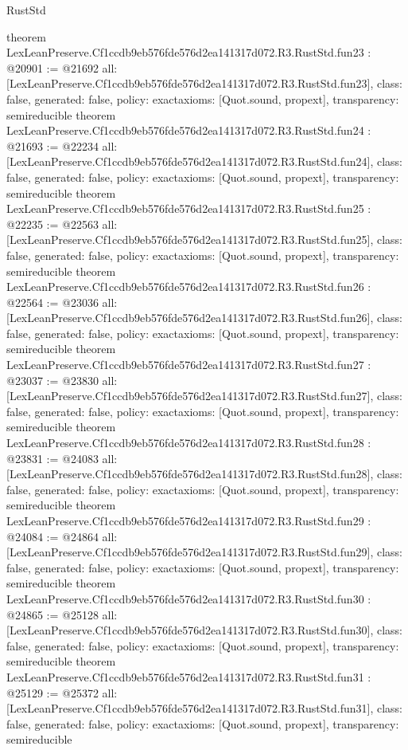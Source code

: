 \begin{lexlean}{RustStd}
\begin{coremodule}
{}
theorem LexLeanPreserve.Cf1ccdb9eb576fde576d2ea141317d072.R3.RustStd.fun23 : @20901 := @21692 {
  all: [LexLeanPreserve.Cf1ccdb9eb576fde576d2ea141317d072.R3.RustStd.fun23],
  class: false,
  generated: false,
  policy: exact{axioms: [Quot.sound, propext]},
  transparency: semireducible
}
theorem LexLeanPreserve.Cf1ccdb9eb576fde576d2ea141317d072.R3.RustStd.fun24 : @21693 := @22234 {
  all: [LexLeanPreserve.Cf1ccdb9eb576fde576d2ea141317d072.R3.RustStd.fun24],
  class: false,
  generated: false,
  policy: exact{axioms: [Quot.sound, propext]},
  transparency: semireducible
}
theorem LexLeanPreserve.Cf1ccdb9eb576fde576d2ea141317d072.R3.RustStd.fun25 : @22235 := @22563 {
  all: [LexLeanPreserve.Cf1ccdb9eb576fde576d2ea141317d072.R3.RustStd.fun25],
  class: false,
  generated: false,
  policy: exact{axioms: [Quot.sound, propext]},
  transparency: semireducible
}
theorem LexLeanPreserve.Cf1ccdb9eb576fde576d2ea141317d072.R3.RustStd.fun26 : @22564 := @23036 {
  all: [LexLeanPreserve.Cf1ccdb9eb576fde576d2ea141317d072.R3.RustStd.fun26],
  class: false,
  generated: false,
  policy: exact{axioms: [Quot.sound, propext]},
  transparency: semireducible
}
theorem LexLeanPreserve.Cf1ccdb9eb576fde576d2ea141317d072.R3.RustStd.fun27 : @23037 := @23830 {
  all: [LexLeanPreserve.Cf1ccdb9eb576fde576d2ea141317d072.R3.RustStd.fun27],
  class: false,
  generated: false,
  policy: exact{axioms: [Quot.sound, propext]},
  transparency: semireducible
}
theorem LexLeanPreserve.Cf1ccdb9eb576fde576d2ea141317d072.R3.RustStd.fun28 : @23831 := @24083 {
  all: [LexLeanPreserve.Cf1ccdb9eb576fde576d2ea141317d072.R3.RustStd.fun28],
  class: false,
  generated: false,
  policy: exact{axioms: [Quot.sound, propext]},
  transparency: semireducible
}
theorem LexLeanPreserve.Cf1ccdb9eb576fde576d2ea141317d072.R3.RustStd.fun29 : @24084 := @24864 {
  all: [LexLeanPreserve.Cf1ccdb9eb576fde576d2ea141317d072.R3.RustStd.fun29],
  class: false,
  generated: false,
  policy: exact{axioms: [Quot.sound, propext]},
  transparency: semireducible
}
theorem LexLeanPreserve.Cf1ccdb9eb576fde576d2ea141317d072.R3.RustStd.fun30 : @24865 := @25128 {
  all: [LexLeanPreserve.Cf1ccdb9eb576fde576d2ea141317d072.R3.RustStd.fun30],
  class: false,
  generated: false,
  policy: exact{axioms: [Quot.sound, propext]},
  transparency: semireducible
}
theorem LexLeanPreserve.Cf1ccdb9eb576fde576d2ea141317d072.R3.RustStd.fun31 : @25129 := @25372 {
  all: [LexLeanPreserve.Cf1ccdb9eb576fde576d2ea141317d072.R3.RustStd.fun31],
  class: false,
  generated: false,
  policy: exact{axioms: [Quot.sound, propext]},
  transparency: semireducible
}
\end{coremodule}
\end{lexlean}
